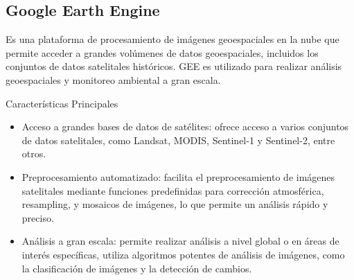 \subsection{Google Earth Engine}

Es una plataforma de procesamiento de imágenes geoespaciales en la nube que permite acceder a grandes 
volúmenes de datos geoespaciales, incluidos los conjuntos de datos satelitales históricos. GEE es utilizado
para realizar análisis geoespaciales y monitoreo ambiental a gran escala.

Características Principales

\begin{itemize}
	\item Acceso a grandes bases de datos de satélites: ofrece acceso a varios conjuntos de datos satelitales,
	 como Landsat, MODIS, Sentinel-1 y Sentinel-2, entre otros.
	\item Preprocesamiento automatizado: facilita el preprocesamiento de imágenes satelitales mediante funciones predefinidas
	 para corrección atmosférica, resampling, y mosaicos de imágenes, lo que permite un análisis rápido y 
	 preciso.
	\item Análisis a gran escala: permite realizar análisis a nivel global o en áreas de interés específicas,
	 utiliza algoritmos potentes de análisis de imágenes, como la clasificación de imágenes y la detección 
	 de cambios.
\end{itemize}




